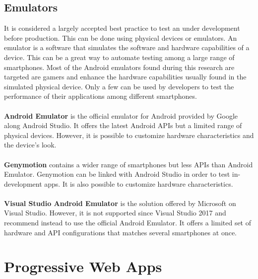 \documentclass{kththesis}
\begin{document}


\subsection{Emulators}
    It is considered a largely accepted best practice to test an under development before production. This can be done using physical devices or emulators. An emulator is a software that simulates the software and hardware capabilities of a device\cite{emulator_def}. This can be a great way to automate testing among a large range of smartphones. Most of the Android emulators found during this research are targeted are gamers and enhance the hardware capabilities usually found in the simulated physical device. Only a few can be used by developers to test the performance of their applications among different smartphones.
    
\paragraph{}
\textbf{Android Emulator} \cite{android_emulator} is the official emulator for Android provided by Google along Android Studio. It offers the latest Android APIs but a limited range of physical devices. However, it is possible to customize hardware characteristics and the device's look.

\paragraph{}
\textbf{Genymotion} \cite{genymotion_emulator} contains a wider range of smartphones but less APIs than Android Emulator. Genymotion can be linked with Android Studio in order to test in-development apps. It is also possible to customize hardware characteristics.

\paragraph{}
\textbf{Visual Studio Android Emulator} \cite{microsoft_emulator} is the solution offered by Microsoft on Visual Studio. However, it is not supported since Visual Studio 2017 and recommend instead to use the official Android Emulator. It offers a limited set of hardware and API configurations that matches several smartphones at once. 

\section{Progressive Web Apps}
\end{document}
